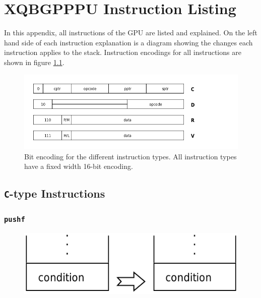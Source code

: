 \chapter{XQBGPPPU Instruction Listing}

	In this appendix, all instructions of the GPU are listed and explained. On
	the left hand side of each instruction explanation is a diagram showing the
	changes each instruction applies to the stack. Instruction encodings for
	all instructions are shown in figure \ref{encodingfiga}.

	\begin{figure}[H]
		\centering
		\caption{Bit encoding for the different instruction types. All
			instruction types have a fixed width 16-bit encoding.}
		\label{encodingfiga}
		\includegraphics[width=0.75\linewidth]{figure/pdf/instruction_layout} 
	\end{figure}


\newpage

\section{\texttt{C}-type Instructions}
	
	
	\subsection*{\texttt{pushf}}
	
		\begin{figure}
			\begin{flushright}
				\includegraphics[width=\linewidth]{figure/pdf/i_pushf} 
			\end{flushright}
			\vspace{120pt}
		\end{figure}
	
